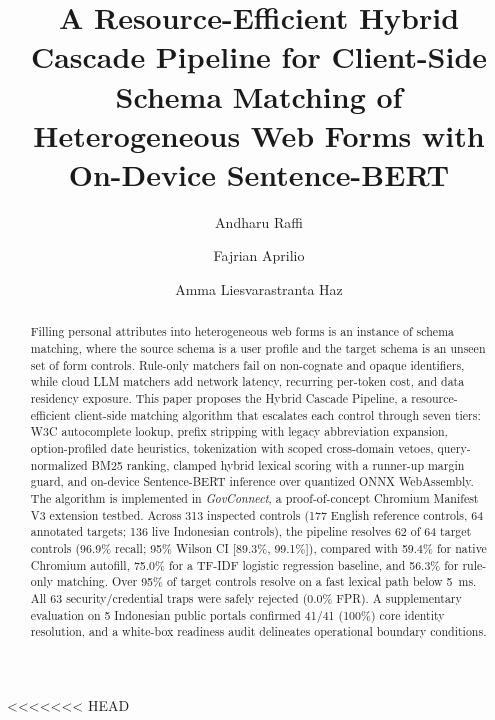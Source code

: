 \documentclass[runningheads,a4paper]{llncs}
\begin{document}
<<<<<<< HEAD
\title{A Resource-Efficient Hybrid Cascade Pipeline for Client-Side Schema Matching of Heterogeneous Web Forms with On-Device Sentence-BERT}

\author{Andharu Raffi \and Fajrian Aprilio \and
Amma Liesvarastranta Haz}

\maketitle

\begin{abstract}
Filling personal attributes into heterogeneous web forms is an instance of schema matching, where the source schema is a user profile and the target schema is an unseen set of form controls. Rule-only matchers fail on non-cognate and opaque identifiers, while cloud LLM matchers add network latency, recurring per-token cost, and data residency exposure. This paper proposes the Hybrid Cascade Pipeline, a resource-efficient client-side matching algorithm that escalates each control through seven tiers: W3C autocomplete lookup, prefix stripping with legacy abbreviation expansion, option-profiled date heuristics, tokenization with scoped cross-domain vetoes, query-normalized BM25 ranking, clamped hybrid lexical scoring with a runner-up margin guard, and on-device Sentence-BERT inference over quantized ONNX WebAssembly. The algorithm is implemented in \emph{GovConnect}, a proof-of-concept Chromium Manifest V3 extension testbed. Across 313 inspected controls (177 English reference controls, 64 annotated targets; 136 live Indonesian controls), the pipeline resolves 62 of 64 target controls (96.9\% recall; 95\% Wilson CI [89.3\%, 99.1\%]), compared with 59.4\% for native Chromium autofill, 75.0\% for a TF-IDF logistic regression baseline, and 56.3\% for rule-only matching. Over 95\% of target controls resolve on a fast lexical path below 5~ms. All 63 security/credential traps were safely rejected (0.0\% FPR). A supplementary evaluation on 5 Indonesian public portals confirmed 41/41 (100\%) core identity resolution, and a white-box readiness audit delineates operational boundary conditions.
\end{abstract}
\end{document}
